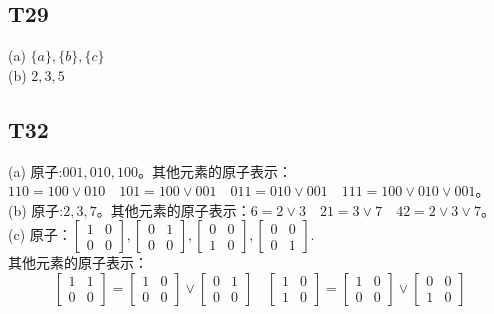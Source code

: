 \documentclass{article}
\begin{document}
\subsection{T29}
(a) $\{a\}, \{b\}, \{c\}$\\
(b) $2, 3, 5$
\subsection{T32}
(a) 原子:$001, 010, 100$。其他元素的原子表示：$110 = 100 \lor 010 \quad 101 = 100 \lor 001 \quad 
011 = 010 \lor 001 \quad 111 = 100 \lor 010 \lor 001$。\\
(b) 原子:$2, 3, 7$。其他元素的原子表示：$6 = 2 \lor 3 \quad 21 = 3 \lor 7 \quad 42 = 2 \lor 3 \lor 7$。\\
(c) 原子：$
\begin{bmatrix}
    1 & 0\\
    0 & 0
\end{bmatrix},
\begin{bmatrix}
    0 & 1\\
    0 & 0
\end{bmatrix},
\begin{bmatrix}
    0 & 0\\
    1 & 0
\end{bmatrix},
\begin{bmatrix}
    0 & 0\\
    0 & 1
\end{bmatrix}$.\\
其他元素的原子表示：
$$
\begin{bmatrix}
    1 & 1\\
    0 & 0
\end{bmatrix}
=
\begin{bmatrix}
    1 & 0\\
    0 & 0
\end{bmatrix}
\lor
\begin{bmatrix}
    0 & 1\\
    0 & 0
\end{bmatrix}
\quad 
\begin{bmatrix}
    1 & 0\\
    1 & 0
\end{bmatrix}
=
\begin{bmatrix}
    1 & 0\\
    0 & 0
\end{bmatrix}
\lor
\begin{bmatrix}
    0 & 0\\
    1 & 0
\end{bmatrix}
$$
\end{document}
